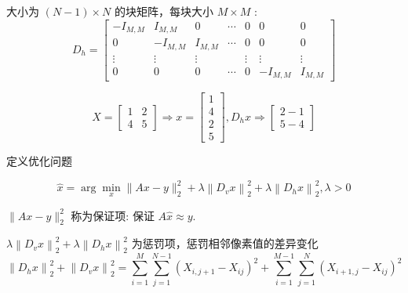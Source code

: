 \begin{definition}[水平差分矩阵]
    大小为 $ (N-1) \times N $ 的块矩阵，每块大小 $ M \times M $ :
\begin{equation}
D_{h}=\left[\begin{array}{ccccccc}
-I_{M, M} & I_{M, M} & 0 & \cdots & 0 & 0 & 0 \\
0 & -I_{M, M} & I_{M, M} & \cdots & 0 & 0 & 0 \\
\vdots & \vdots & \vdots & & \vdots & \vdots & \vdots \\
0 & 0 & 0 & \cdots & 0 & -I_{M, M} & I_{M, M}
\end{array}\right]
\end{equation}
\end{definition}

\begin{example}
    \begin{equation} X=\left[\begin{array}{ll}1 & 2 \\ 4 & 5\end{array}\right] \Rightarrow x=\left[\begin{array}{l}1 \\ 4 \\ 2 \\ 5\end{array}\right], D_{h} x \Rightarrow\left[\begin{array}{l}2-1 \\ 5-4\end{array}\right] \end{equation}
\end{example}

定义优化问题

\begin{problem}
     \begin{equation}
\hat{x}=\arg \min _{x}\|A x-y\|_{2}^{2}+\lambda\left\|D_{v} x\right\|_{2}^{2}+\lambda\left\|D_{h} x\right\|_{2}^{2}, \lambda>0
\end{equation}

$ \|A x-y\|_{2}^{2} $ 称为保证项: 保证 $ A \hat{x} \approx y $.

$ \lambda\left\|D_{v} x\right\|_{2}^{2}+\lambda\left\|D_{h} x\right\|_{2}^{2} $ 为惩罚项，惩罚相邻像素值的差异变化
\begin{equation}
\left\|D_{h} x\right\|_{2}^{2}+\left\|D_{v} x\right\|_{2}^{2}=\sum_{i=1}^{M} \sum_{j=1}^{N-1}\left(X_{i, j+1}-X_{i j}\right)^{2}+\sum_{i=1}^{M-1} \sum_{j=1}^{N}\left(X_{i+1, j}-X_{i j}\right)^{2}
\end{equation}
\end{problem}

